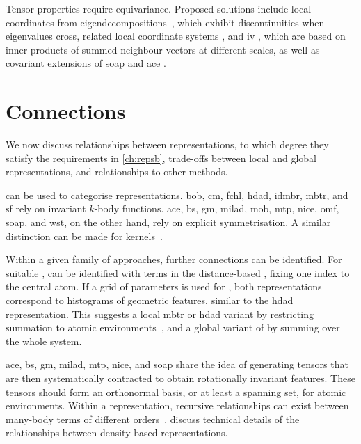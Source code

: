 Tensor properties require equivariance.
Proposed solutions include local coordinates from eigendecompositions~\cite{rrl2015q}, which exhibit discontinuities when eigenvalues cross, related local coordinate systems \cite{tzk2018q},
and \gls{iv} \cite{lkd2015q}, which are based on inner products of summed neighbour vectors at different scales, as well as covariant extensions of \gls{soap} \cite{gwcc2018q,cwc2018q} and \gls{ace} \cite{d2020Aq}.

\section{Connections}

We now discuss relationships between representations, to which degree they satisfy the requirements in \cref{ch:repsb}, trade-offs between local and global representations, and relationships to other methods.

 can be used to categorise representations. \Gls{bob}, \gls{cm}, \gls{fchl}, \gls{hdad}, \gls{idmbr}, \gls{mbtr}, and \gls{sf} rely on invariant $k$-body functions. \Gls{ace}, \gls{bs}, \gls{gm}, \gls{milad}, \gls{mob}, \gls{mtp}, \gls{nice}, \gls{omf}, \gls{soap}, and \gls{wst}, on the other hand, rely on explicit symmetrisation.
A similar distinction can be made for kernels~\cite{gzv2018q}.

Within a given family of approaches, further connections can be identified. For suitable \hps, \sfs can be identified with terms in the distance-based \mbtr, fixing one index to the central atom. If a grid of parameters is used for \sfs, both representations correspond to histograms of geometric features, similar to the \gls{hdad} representation.
This suggests a local \gls{mbtr} or \gls{hdad} variant by restricting summation to atomic environments~\cite{localmbtr2019}, and a global variant of \sfs by summing over the whole system.

\Gls{ace}, \gls{bs}, \gls{gm}, \gls{milad}, \gls{mtp}, \gls{nice}, and \gls{soap} share the idea of generating tensors that are then systematically contracted to obtain rotationally invariant features.
These tensors should form an orthonormal basis, or at least a spanning set, for atomic environments.
Within a representation, recursive relationships can exist between many-body terms of different orders~\cite{c2019Bq,npc2020q,dboo2022q}.
 discuss technical details of the relationships between density-based representations.

